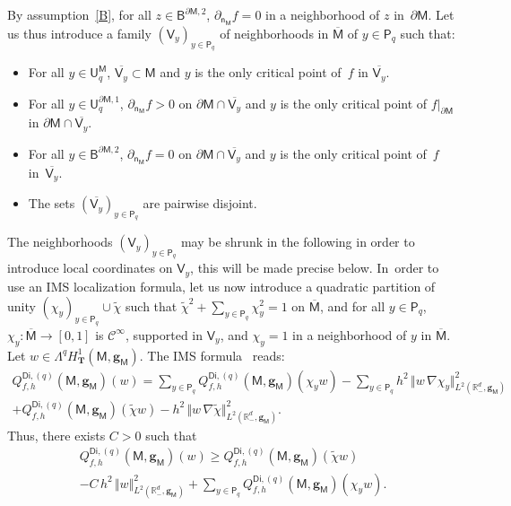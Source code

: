 \documentclass[JEP,XML,SOM,Unicode,NoEqCountersInSection,NoFloatCountersInSection,published]{cedram}
\newcommand{\mbf}[1]{\mathbf{#1}}
\let\pa\partial
\theoremstyle{plain}
\theoremstyle{definition}
\begin{document}
By assumption~\ref{B}, for all $z\in \mathsf B^{\pa \mathsf M,2}$,
$ \partial_{\mathsf n_{\mathsf M}}f=0$ in a neighborhood of $z$
in~$\pa \mathsf M$. Let us thus introduce a family $(\mathsf
V_y)_{y\in \mathsf P_q}$ of neighborhoods in
$\overline{\mathsf M}$ of $y\in \mathsf P_q$ such that:
\begin{itemize}
\item
For all $y\in \mathsf U^{\mathsf M}_q$, $\overline{\mathsf V_y}\subset \mathsf M$ and $y$ is the only critical point of~$f$ in $\overline{\mathsf V_y}$.
\item
For all $y\in \mathsf U^{\pa \mathsf M,1}_q$, $
\partial_{\mathsf n_{\mathsf M}}f>0$ on $\pa \mathsf M \cap
\overline{\mathsf V_y}$ and $y$ is the only critical point of $f|_{\pa \mathsf M}$ in $\pa \mathsf M \cap \overline{\mathsf V_y}$.
\item
For all $y\in \mathsf B^{\pa \mathsf M,2}$, $ \partial_{\mathsf n_{\mathsf M}}f=0$ on $\pa \mathsf M \cap\overline {\mathsf V_y}$
and $y$ is the only critical point of~$f$ in~$\overline {\mathsf V_y}$.
\item
The sets $(\overline{\mathsf V_y})_{y\in \mathsf P_q}$ are pairwise disjoint.
\end{itemize}
The neighborhoods $(\mathsf V_y)_{y\in \mathsf P_q}$ may be shrunk in the
following in order to introduce local coordinates on $\mathsf V_y$, this will be made precise below. In~order to use an IMS localization formula, let us now introduce a
quadratic partition of unity $(\chi_y)_{y\in \mathsf P_q}\cup \tilde
\chi$ such that $\tilde \chi^2 + \sum_{y\in \mathsf P_q} \chi_y^2 =
1$ on $\overline{\mathsf M}$, and for all $y\in \mathsf P_q$, $\chi_y: \overline{\mathsf M}\to
[0,1]$ is $\mathcal C^\infty$, supported in $\mathsf V_y$, and
$\chi_y=1$ in a neighborhood of $y$ in $\overline{\mathsf M} $.
Let $w\in \Lambda^qH^1_{\mbf T}(\mathsf M,\mbf g_{\mathsf M})$.
The IMS formula~\cite{CFKS,helffer-nier-06} reads:\vspace*{-3pt}
\begin{multline*}
Q_{f,h}^{\mathsf{Di},(q)}(\mathsf M,\mbf g_{\mathsf M})(w) =\sum_{y\in \mathsf P_q} Q_{f,h}^{\mathsf{Di},(q)}(\mathsf M,\mbf g_{\mathsf M})(\chi_y w) -\sum_{y\in \mathsf P_q} h^2\,\big \Vert w\, \nabla \chi_y \big \Vert_{L^2(\mathbb R_-^d,\mbf g_{\mathsf M})}^2\\
+ Q_{f,h}^{\mathsf{Di},(q)}(\mathsf M,\mbf g_{\mathsf M})(\tilde \chi w) - h^2\,\big \Vert w\, \nabla \tilde \chi \big \Vert_{L^2(\mathbb R_-^d,\mbf g_{\mathsf M})}^2.
\end{multline*}
Thus, there exists $C>0$ such that\vspace*{-3pt}
\begin{multline}
\label{eq.IMSfin}
Q_{f,h}^{\mathsf{Di},(q)}(\mathsf M,\mbf g_{\mathsf M})(w) \ge
Q_{f,h}^{\mathsf{Di},(q)}(\mathsf M,\mbf g_{\mathsf M})(\tilde \chi
w)\\
-C\, h^2\, \Vert w \Vert_{L^2(\mathbb R_-^d,\mbf g_{\mathsf
M})}^2
+\sum_{y\in \mathsf P_q} Q_{f,h}^{\mathsf{Di},(q)}(\mathsf M,\mbf g_{\mathsf M})(\chi_y w).
\end{multline}
\end{document}
